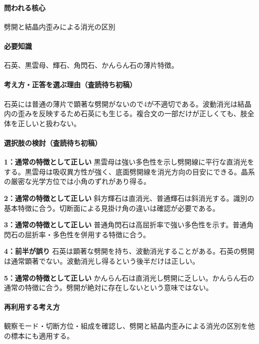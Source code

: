 \paragraph{問われる核心} 劈開と結晶内歪みによる消光の区別

\paragraph{必要知識} 石英、黒雲母、輝石、角閃石、かんらん石の薄片特徴。

\paragraph{考え方・正答を選ぶ理由（査読待ち初稿）} 石英には普通の薄片で顕著な劈開がないので4が不適切である。波動消光は結晶内の歪みを反映するため石英にも生じる。複合文の一部だけが正しくても、肢全体を正しいと扱わない。

\paragraph{選択肢の検討（査読待ち初稿）}\mbox{}\par

\noindent\textbf{1：通常の特徴として正しい} 黒雲母は強い多色性を示し劈開線に平行な直消光をする。黒雲母は吸収異方性が強く、底面劈開線を消光方向の目安にできる。晶系の厳密な光学方位では小角のずれがあり得る。\par

\noindent\textbf{2：通常の特徴として正しい} 斜方輝石は直消光、普通輝石は斜消光する。識別の基本特徴に合う。切断面による見掛け角の違いは確認が必要である。\par

\noindent\textbf{3：通常の特徴として正しい} 普通角閃石は高屈折率で強い多色性を示す。普通角閃石の屈折率・多色性を併用する特徴に合う。\par

\noindent\textbf{4：前半が誤り} 石英は顕著な劈開を持ち、波動消光することがある。石英の劈開は通常顕著でない。波動消光し得るという後半だけは正しい。\par

\noindent\textbf{5：通常の特徴として正しい} かんらん石は直消光し劈開に乏しい。かんらん石の通常の特徴に合う。劈開が絶対に存在しないという意味ではない。\par

\paragraph{再利用する考え方} 観察モード・切断方位・組成を確認し、劈開と結晶内歪みによる消光の区別を他の標本にも適用する。

